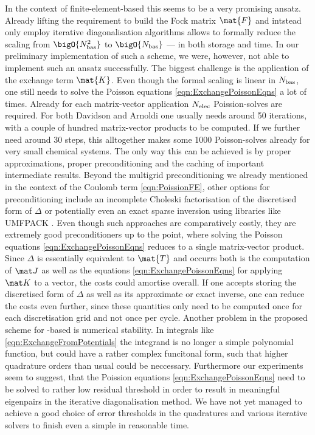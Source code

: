 In the context of finite-element-based \HF
this seems to be a very promising ansatz.
Already lifting the requirement to build the Fock matrix $\mat{F}$
and intstead only employ
iterative diagonalisation algorithms
allows to formally reduce the scaling from $\bigO{\Nbas^2}$ to $\bigO{\Nbas}$
--- in both storage and time.
In our preliminary implementation of such a scheme,
we were, however, not able to implement such an ansatz successfully.
The biggest challenge is
the application of the exchange term $\mat{K}$.
Even though the formal scaling is linear in $N_\text{bas}$,
one still needs to solve the Poisson equations \eqref{eqn:ExchangePoissonEqns}
a lot of times.
Already for each matrix-vector application
$N_\text{elec}$ Poission-solves are required.
For both Davidson and Arnoldi one usually needs around 50 iterations,
with a couple of hundred matrix-vector products to be computed.
If we further need around 30 \SCF steps,
this alltogether makes some 1000 Poisson-solves
already for very small chemical systems.
The only way this can be achieved is by
proper approximations, proper preconditioning and
the caching of important intermediate results.
Beyond the multigrid preconditioning we already mentioned
in the context of the Coulomb term \eqref{eqn:PoissionFE},
other options for preconditioning include
an incomplete Choleski factorisation
of the discretised form of $\Delta$
or potentially even an exact sparse inversion
using libraries like UMFPACK
.
Even though such approaches are comparatively costly,
they are extremely good preconditioners up to the point,
where solving the Poisson equations \eqref{eqn:ExchangePoissonEqns}
reduces to a single matrix-vector product.
Since $\Delta$ is essentially equivalent to $\mat{T}$
and occurrs both is the computation of $\matJ$
as well as the equations \eqref{eqn:ExchangePoissonEqns}
for applying $\matK$ to a vector, the costs could amortise overall.
If one accepts storing the discretised form of $\Delta$
as well as its approximate or exact inverse,
one can reduce the costs even further,
since these quantities only need to be computed
once for each discretisation grid
and not once per \SCF cycle.
Another problem in the proposed scheme for \FE-based \HF
is numerical stability.
In integrals like \eqref{eqn:ExchangeFromPotentials}
the integrand is no longer a simple polynomial function,
but could have a rather complex funcitonal form,
such that higher quadrature orders than usual
could be neccessary.
Furthermore our experiments seem to suggest,
that the Poission equations \eqref{eqn:ExchangePoissonEqns}
need to be solved to rather low residual threshold
in order to result in meaningful eigenpairs
in the iterative diagonalisation method.
We have not yet managed to achieve
a good choice of error thresholds in the quadratures
and various iterative solvers to finish even a simple \SCF
in reasonable time.

